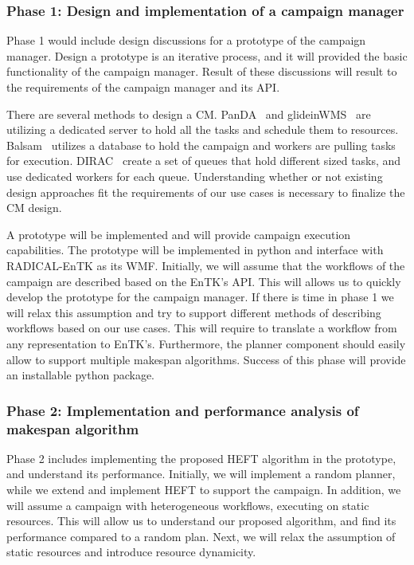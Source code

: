 \subsubsection{Phase 1: Design and implementation of a campaign manager}
\label{obj1}

Phase 1 would include design discussions for a prototype of the campaign manager.
Design a prototype is an iterative process, and it will provided the basic functionality of the campaign manager.
Result of these discussions will result to the requirements of the campaign manager and its API.

There are several methods to design a CM.
PanDA~\cite{maeno2008panda} and glideinWMS~\cite{sfiligoi2008glidein} are utilizing a dedicated server to hold all the tasks and schedule them to resources.
Balsam~\cite{salim2019balsam} utilizes a database to hold the campaign and workers are pulling tasks for execution.
DIRAC~\cite{casajus2010dirac} create a set of queues that hold different sized tasks, and use dedicated workers for each queue.
Understanding whether or not existing design approaches fit the requirements of our use cases is necessary to finalize the CM design.

A prototype will be implemented and will provide campaign execution capabilities.
The prototype will be implemented in python and interface with RADICAL-EnTK as its WMF.
Initially, we will assume that the workflows of the campaign are described based on the EnTK's API.
This will allows us to quickly develop the prototype for the campaign manager.
If there is time in phase 1 we will relax this assumption and try to support different methods of describing workflows based on our use cases.
This will require to translate a workflow from any representation to EnTK's.
Furthermore, the planner component should easily allow to support multiple makespan algorithms.
Success of this phase will provide an installable python package. 


\subsubsection{Phase 2: Implementation and performance analysis of makespan algorithm}
\label{obj2}
Phase 2 includes implementing the proposed HEFT algorithm in the prototype, and understand its performance.
Initially, we will implement a random planner, while we extend and implement HEFT to support the campaign.
In addition, we will assume a campaign with heterogeneous workflows, executing on static resources.
This will allow us to understand our proposed algorithm, and find its performance compared to a random plan.
Next, we will relax the assumption of static resources and introduce resource dynamicity.

